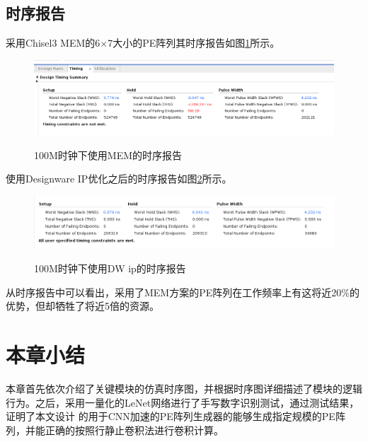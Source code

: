     \subsection{时序报告}
    采用Chisel3 MEM的6×7大小的PE阵列其时序报告如图\ref{mem_time}所示。
    \begin{figure}[h]
        \centering
        \includegraphics[scale=0.4]{../pdf/old_time.png}\\
        \caption{100M时钟下使用MEM的时序报告}
        \label{mem_time}
    \end{figure}
    使用Designware IP优化之后的时序报告如图\ref{dw_time}所示。
    \begin{figure}[h]
        \centering
        \includegraphics[scale=0.4]{../pdf/new_time.png}\\
        \caption{100M时钟下使用DW ip的时序报告}
        \label{dw_time}
    \end{figure}
    从时序报告中可以看出，采用了MEM方案的PE阵列在工作频率上有这将近20\%的优势，但却牺牲了将近5倍的资源。

\section{本章小结}
本章首先依次介绍了关键模块的仿真时序图，并根据时序图详细描述了模块的逻辑行为。之后，采用一量化的LeNet网络进行了手写数字识别测试，通过测试结果，证明了本文设计
的用于CNN加速的PE阵列生成器的能够生成指定规模的PE阵列，并能正确的按照行静止卷积法进行卷积计算。


